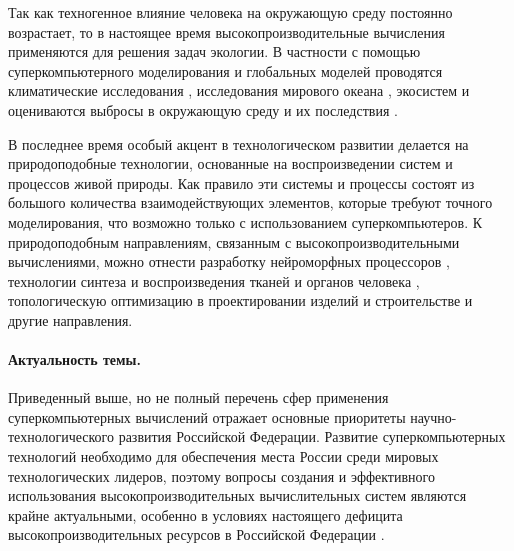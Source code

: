 \documentclass[a4paper,14pt]{extarticle}                     %
\numberwithin{equation}{section}                             %
\numberwithin{figure}{section}                               %
\numberwithin{table}{section}                                %
\theoremstyle{plain}                                         %
\numberwithin{theorem}{section}                              %
\numberwithin{lemma}{section}                                %
\numberwithin{definition}{section}                           %
\begin{document}
Так как техногенное влияние человека на окружающую среду постоянно возрастает, то в настоящее время высокопроизводительные вычисления применяются для решения задач экологии.
В частности с помощью суперкомпьютерного моделирования и глобальных моделей проводятся климатические исследования \cite{Kulkarni2024SuperClimate}, исследования мирового океана \cite{Wei2024SuperOcean}, экосистем \cite{Rahman2024SuperSpecies} и оцениваются выбросы в окружающую среду и их последствия \cite{Ostromsky2024SuperAir}.

В последнее время особый акцент в технологическом развитии делается на природоподобные технологии, основанные на воспроизведении систем и процессов живой природы.
Как правило эти системы и процессы состоят из большого количества взаимодействующих элементов, которые требуют точного моделирования, что возможно только с использованием суперкомпьютеров.
К природоподобным направлениям, связанным с высокопроизводительными вычислениями, можно отнести разработку нейроморфных процессоров \cite{Rhodes2019SuperNuero}, технологии синтеза и воспроизведения тканей и органов человека \cite{Wang2012SuperTissues}, топологическую оптимизацию в проектировании изделий и строительстве \cite{Fedchikov2024SuperBim} и другие направления.

\paragraph{Актуальность темы.}

Приведенный выше, но не полный перечень сфер применения суперкомпьютерных вычислений отражает основные приоритеты научно-технологического развития Российской Федерации.
Развитие суперкомпьютерных технологий необходимо для обеспечения места России среди мировых технологических лидеров, поэтому вопросы создания и эффективного использования высокопроизводительных вычислительных систем являются крайне актуальными, особенно в условиях настоящего дефицита высокопроизводительных ресурсов в Российской Федерации \cite{Voevodin2021SuperRussia}.
\end{document}
